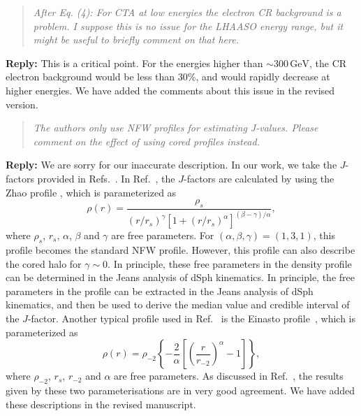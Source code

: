 \documentclass{article}
\def\GeV{\mathrm{GeV}} %
\begin{document}
\vskip 0.5cm
\begin{quote}
\emph{After Eq. (4): For CTA at low energies the electron CR background is a problem. I suppose this is no issue for the LHAASO energy range,
but it might be useful to briefly comment on that here.}
\end{quote}

\textbf{Reply:} This is a critical point. For the energies higher than $\sim300\,\GeV$, the CR electron background would be less than 30\%, and would rapidly decrease at higher energies.  We have added the comments about this issue in the revised version.

\vskip 0.5cm
\begin{quote}
\emph{The authors only use NFW profiles for estimating J-values. Please comment on the effect of using cored profiles instead.}
\end{quote}

\textbf{Reply:} We are sorry for our inaccurate description. In our work, we take the $J$-factors provided in Refs.~\cite{Geringer-Sameth:2014yza,Hutten:2016jko}. In Ref.~\cite{Geringer-Sameth:2014yza}, the $J$-factors are calculated by using the Zhao profile \cite{Hernquist:1990be,Zhao:1995cp}, which is parameterized as\
\begin{equation}
\rho(r)=\frac{\rho_s}{(r/r_s)^\gamma[1+(r/r_s)^\alpha]^{(\beta-\gamma)/\alpha}},
\end{equation}
where $\rho_s$, $r_s$, $\alpha$, $\beta$ and $\gamma$ are free parameters. For $(\alpha, \beta, \gamma)=(1,3,1)$, this profile becomes the standard NFW profile. However, this profile can also describe the cored halo for $\gamma\sim 0$. In principle, these free parameters in the density profile can be determined in the Jeans analysis of dSph kinematics. In principle, the free parameters in the profile can be extracted in the Jeans analysis of dSph kinematics, and then be used to derive the median value and credible interval of the $J$-factor. Another typical profile used in Ref.~\cite{Hutten:2016jko} is the Einasto profile~\cite{Graham:2005xx}, which is parameterized as
\begin{equation}
\rho(r)=\rho_{-2}\left\{ -\frac{2}{\alpha}\left[\left(\frac{r}{r_{-2}}\right)^\alpha-1\right] \right\},
\end{equation}
where $\rho_{-2}$, $r_s$, $r_{-2}$ and $\alpha$ are free parameters. As discussed in Ref.~\cite{Bonnivard:2014kza}, the results given by these two parameterisations are in very good agreement. We have added these descriptions in the revised manuscript.
\end{document}
